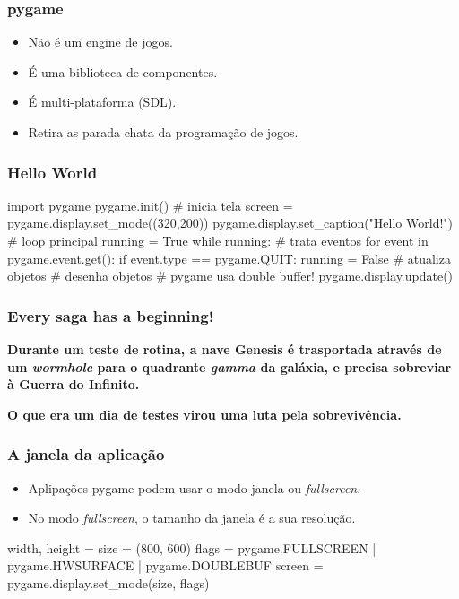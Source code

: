 \begin{frame}
    \frametitle{pygame}

    \begin{itemize}
        \item Não é um engine de jogos.
        \item É uma biblioteca de componentes.
        \item É multi-plataforma (SDL).
        \item Retira as parada chata da programação de jogos.
    \end{itemize}
\end{frame}

\begin{frame}[fragile]
    \frametitle{Hello World}

    \begin{python}
        import pygame
        pygame.init()
        # inicia tela
        screen = pygame.display.set_mode((320,200))
        pygame.display.set_caption("Hello World!")
        # loop principal
        running = True
        while running:
            # trata eventos
            for event in pygame.event.get():
                if event.type == pygame.QUIT:
                    running = False
            # atualiza objetos
            # desenha objetos
            # pygame usa double buffer!
            pygame.display.update()
    \end{python}
\end{frame}


\begin{frame}
    \frametitle{Every saga has a beginning!}
    \vfill
    \begin{center}
    \large \textbf{Durante um teste de rotina, a nave Genesis é trasportada
    através de um \textit{wormhole} para o quadrante \textit{gamma} da galáxia,
    e precisa sobreviar à Guerra do Infinito.}

    \vfill
    \large\textbf{O que era um dia de testes virou uma luta pela sobrevivência.}
    \end{center}
    \vfill
\end{frame}

\begin{frame}[fragile]
    \frametitle{A janela da aplicação}

    \begin{itemize}
        \item Aplipações pygame podem usar o modo janela ou \textit{fullscreen}.
        \item No modo \textit{fullscreen}, o tamanho da janela é a sua resolução.
    \end{itemize}
    \begin{python}
    width, height = size = (800, 600)
    flags = pygame.FULLSCREEN | pygame.HWSURFACE | pygame.DOUBLEBUF
    screen = pygame.display.set_mode(size, flags)
    \end{python}
\end{frame}

